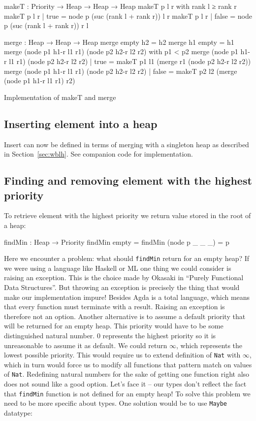 \begin{listing}[htb!]
\begin{code}
makeT : Priority → Heap → Heap → Heap
makeT p l r with rank l ≥ rank r
makeT p l r | true  = node p (suc (rank l + rank r)) l r
makeT p l r | false = node p (suc (rank l + rank r)) r l

merge : Heap → Heap → Heap
merge empty h2 = h2
merge h1 empty = h1
merge (node p1 h1-r l1 r1) (node p2 h2-r l2 r2)
  with p1 < p2
merge (node p1 h1-r l1 r1) (node p2 h2-r l2 r2)
  | true  = makeT p1 l1 (merge r1 (node p2 h2-r l2 r2))
merge (node p1 h1-r l1 r1) (node p2 h2-r l2 r2)
  | false = makeT p2 l2 (merge (node p1 h1-r l1 r1) r2)
\end{code}
\caption{Implementation of makeT and merge}\label{lst:makeT-merge}
\end{listing}

\subsection{Inserting element into a heap}

Insert can now be defined in terms of merging with a singleton heap as described in Section~\ref{sec:wblh}. See companion code for implementation.

\subsection{Finding and removing element with the highest priority}

To retrieve element with the highest priority we return value stored in the root of a heap:

\begin{code}
findMin : Heap → Priority
findMin empty          = 
findMin (node p _ _ _) = p
\end{code}
\noindent
Here we encounter a problem: what should \texttt{findMin} return for an empty heap? If we were using a language like Haskell or ML one thing we could consider is raising an exception. This is the choice made by Okasaki in ``Purely Functional Data Structures''. But throwing an exception is precisely the thing that would make our implementation impure! Besides Agda is a total language, which means that every function must terminate with a result. Raising an exception is therefore not an option. Another alternative is to assume a default priority that will be returned for an empty heap. This priority would have to be some distinguished natural number. $0$ represents the highest priority so it is unreasonable to assume it as default. We could return $\infty$, which represents the lowest possible priority. This would require us to extend definition of \texttt{Nat} with $\infty$, which in turn would force us to modify all functions that pattern match on values of \texttt{Nat}. Redefining natural numbers for the sake of getting one function right also does not sound like a good option. Let's face it -- our types don't reflect the fact that \texttt{findMin} function is not defined for an empty heap! To solve this problem we need to be more specific about types. One solution would be to use \texttt{Maybe} datatype:

